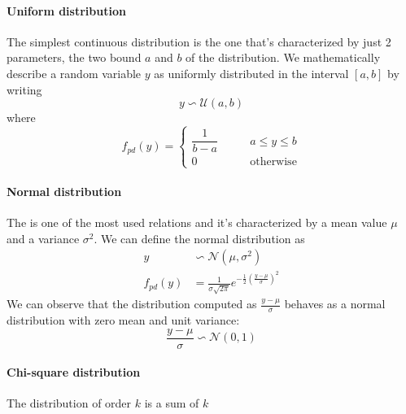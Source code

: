 	\paragraph{Uniform distribution} The simplest continuous distribution is the  one that's characterized by just 2 parameters, the two bound $a$ and $b$ of the distribution. We mathematically describe a random variable $y$ as uniformly distributed in the interval $[a,b]$ by writing
	\[ y \backsim \mathcal U(a,b) \]
	where
	\begin{equation}
		f_{pd}(y) = \begin{cases}
			\dfrac{1}{b-a} \qquad& a \leq y \leq b \\0 & \textrm{otherwise}
		\end{cases}
	\end{equation}
	
	\paragraph{Normal distribution} The  is one of the most used relations and it's characterized by a mean value $\mu$ and a variance $\sigma^2$. We can define the normal distribution as
	\begin{equation}
	\begin{aligned}
		y &\backsim \mathcal N(\mu,\sigma^2) \\
		f_{pd}(y) &= \frac 1 {\sigma \sqrt{2\pi}} e ^{-\frac 1 2 \left(\frac{y-\mu}{\sigma}\right)^2}
	\end{aligned}
	\end{equation}
	We can observe that the distribution computed as $\frac{y-\mu}{\sigma}$ behaves as a normal distribution with zero mean and unit variance:
	\[ \frac{y-\mu}{\sigma} \backsim \mathcal N(0,1) \]
	
	\paragraph{Chi-square distribution} The  distribution of order $k$ is a sum of $k$ 
	
	
	
	
	
	
	
	
	
	
	
	
	
	
	
	
	
	
	
	
	
	
	
	
	
	
	
	
	
	
	
	
	